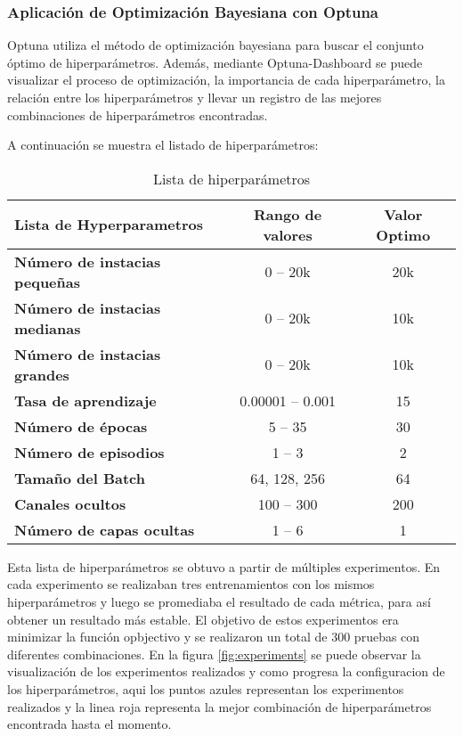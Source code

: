 \subsubsection{Aplicación de Optimización Bayesiana con Optuna}
Optuna utiliza el método de optimización bayesiana para buscar el conjunto óptimo de
hiperparámetros. Además, mediante Optuna-Dashboard se puede visualizar el proceso de
optimización, la importancia de cada hiperparámetro, la relación entre los hiperparámetros
y llevar un registro de las mejores combinaciones de hiperparámetros encontradas.\medskip

A continuación se muestra el listado de hiperparámetros:

\begin{table}[ht]
    \centering
    \begin{tabular}[ht]{l|c|c} 
        \textbf{Lista de Hyperparametros} & \textbf{Rango de valores} & \textbf{Valor Optimo}\\
        \hline
        \textbf{Número de instacias pequeñas} & 0 -- 20k & 20k\\
        \textbf{Número de instacias medianas} & 0 -- 20k & 10k\\
        \textbf{Número de instacias grandes}  & 0 -- 20k & 10k \\
        \textbf{Tasa de aprendizaje} & 0.00001 -- 0.001 & 15 \\
        \textbf{Número de épocas} & 5 -- 35 & 30 \\ 
        \textbf{Número de episodios} & 1 -- 3 & 2 \\
        \textbf{Tamaño del Batch} & 64, 128, 256 & 64\\
        \textbf{Canales ocultos} & 100 -- 300 & 200 \\
        \textbf{Número de capas ocultas} & 1 -- 6 & 1 \\
    \end{tabular}
    \caption{Lista de hiperparámetros}
    \label{tab:hyperparams}
\end{table}

Esta lista de hiperparámetros se obtuvo a partir de múltiples experimentos. En cada 
experimento se realizaban tres entrenamientos con los mismos hiperparámetros y luego
se promediaba el resultado de cada métrica, para así obtener un resultado más estable.
El objetivo de estos experimentos era minimizar la función opbjectivo y se realizaron
un total de 300 pruebas con diferentes combinaciones. En la figura \ref{fig:experiments}
se puede observar la visualización de los experimentos realizados y como progresa la
configuracion de los hiperparámetros, aqui los puntos azules representan los experimentos
realizados y la linea roja representa la mejor combinación de hiperparámetros encontrada
hasta el momento.

